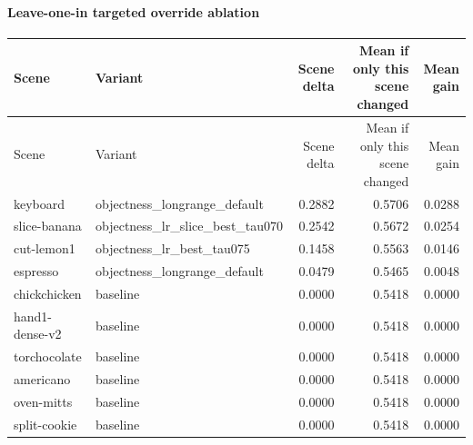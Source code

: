 \documentclass[10pt]{article}
\begin{document}
\paragraph{Leave-one-in targeted override ablation}
\small
\begin{longtable}{llrrr}
\toprule
Scene & Variant & Scene delta & Mean if only this scene changed & Mean gain \\
\midrule
\endfirsthead
\toprule
Scene & Variant & Scene delta & Mean if only this scene changed & Mean gain \\
\midrule
\endhead
keyboard & objectness\_longrange\_default & 0.2882 & 0.5706 & 0.0288 \\
slice-banana & objectness\_lr\_slice\_best\_tau070 & 0.2542 & 0.5672 & 0.0254 \\
cut-lemon1 & objectness\_lr\_best\_tau075 & 0.1458 & 0.5563 & 0.0146 \\
espresso & objectness\_longrange\_default & 0.0479 & 0.5465 & 0.0048 \\
chickchicken & baseline & 0.0000 & 0.5418 & 0.0000 \\
hand1-dense-v2 & baseline & 0.0000 & 0.5418 & 0.0000 \\
torchocolate & baseline & 0.0000 & 0.5418 & 0.0000 \\
americano & baseline & 0.0000 & 0.5418 & 0.0000 \\
oven-mitts & baseline & 0.0000 & 0.5418 & 0.0000 \\
split-cookie & baseline & 0.0000 & 0.5418 & 0.0000 \\
\bottomrule
\end{longtable}
\normalsize
\end{document}
